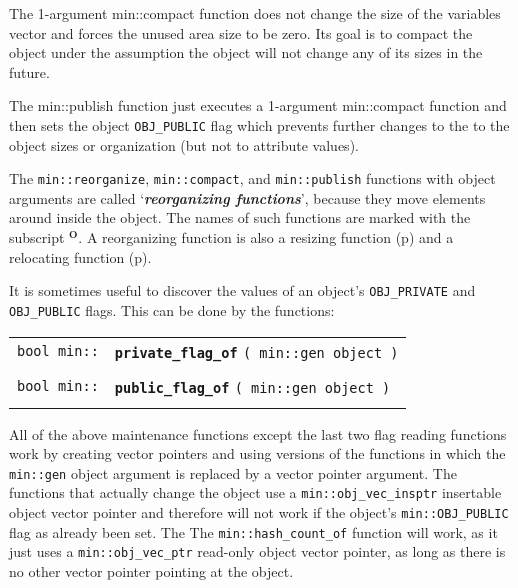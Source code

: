 \documentclass[12pt]{article}
\makeatletter
\newcommand{\TT}[1]{{\tt \bfseries #1}}
\newcommand{\skey}[2]{{\bf \em #1#2}\index{#1}}
\newcommand{\ttindex}[1]{\index{#1@{\tt #1}}}
\newcommand{\subsmkey}[2]{$\mathbf{^{#1}}$\index{#1@$^{#1}$!#2}}
\newcommand{\pagref}[1]{p\pageref{#1}}
\newcommand{\EOL}{\penalty \exhyphenpenalty}
\newenvironment{indpar}[1][0.3in]%
	{\begin{list}{}%
		     {\setlength{\itemsep}{0in}%
		      \setlength{\topsep}{0in}%
		      \setlength{\parsep}{1ex}%
		      \setlength{\labelwidth}{#1}%
		      \setlength{\leftmargin}{#1}%
		      \addtolength{\leftmargin}{\labelsep}}%
	 \item}%
	{\end{list}}
\newcommand{\LABEL}[1]{\label{#1}}
\newcommand{\MINKEY}[1]%
	   {\TT{#1}\ttindex{min::#1}\ttindex{#1}}
\makeatother
\begin{document}
The 1-argument {min::compact} function does not change the
size of the variables vector and forces the unused area size
to be zero.  Its goal is to compact the object under the assumption
the object will not change any of its sizes in the future.

The {min::publish} function just executes a
1-argument {min::compact} function and then sets
the object {\tt OBJ\_\EOL PUBLIC} flag which prevents further changes to the
to the object sizes or organization (but not to attribute values).

The {\tt min::reorganize}, {\tt min::compact}, and {\tt min::\EOL publish}
functions with object arguments
are called `\skey{reorganizing function}s'\label{REORGANIZING-FUNCTIONS},
because they move elements around inside the object.
The names of such functions are marked with the subscript
\subsmkey{O}{of function}.
A reorganizing function is also a resizing function
(\pagref{RESIZING-FUNCTIONS}) and
a relocating function (\pagref{RELOCATING-FUNCTIONS}).

It is sometimes useful to discover the values of an object's
{\tt OBJ\_\EOL PRIVATE} and {\tt OBJ\_\EOL PUBLIC} flags.
This can be done by the functions:

\begin{indpar}\begin{tabular}{r@{}l}
\verb|bool min::| & \MINKEY{private\_flag\_of}
    \verb|( min::gen object )| \\
\LABEL{MIN::PRIVATE_FLAG_OF} \\
\verb|bool min::| & \MINKEY{public\_flag\_of}
    \verb|( min::gen object )| \\
\LABEL{MIN::PUBLIC_FLAG_OF} \\
\end{tabular}\end{indpar}

All of the above maintenance functions except the last two
flag reading functions work by creating
vector pointers and using versions of the functions in which the
{\tt min::gen} object argument is replaced by a vector pointer argument.
The functions that actually change the object use a
{\tt min::\EOL obj\_\EOL vec\_\EOL insptr} insertable object
vector pointer and therefore will not work if the object's
{\tt min::\EOL OBJ\_\EOL PUBLIC} flag as already been set.  The
The {\tt min::hash\_count\_of} function will work, as it just uses a
{\tt min::\EOL obj\_\EOL vec\_\EOL ptr} read-only object vector pointer,
as long as there is no other vector pointer pointing at the object.
\end{document}

